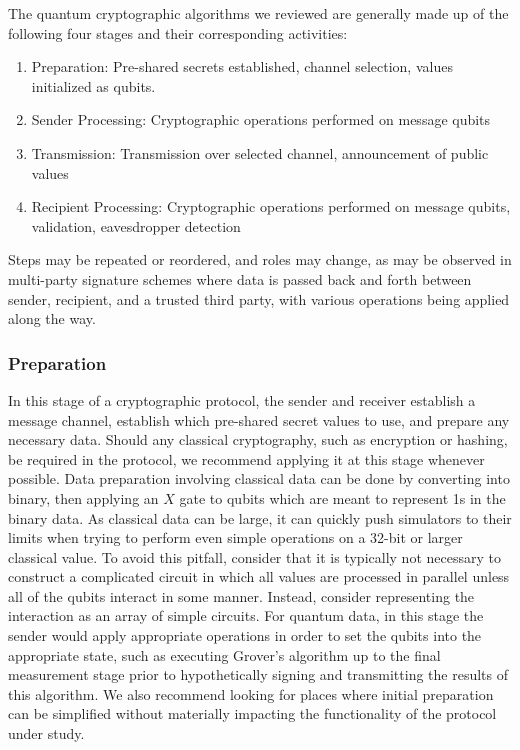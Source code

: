 \documentclass[sigconf]{acmart}
\begin{document}
The quantum cryptographic algorithms we reviewed are generally made up of the following four stages and their corresponding activities:
\begin{enumerate}
\item Preparation: Pre-shared secrets established, channel selection, values initialized as qubits.
\item Sender Processing: Cryptographic operations performed on message qubits
\item Transmission: Transmission over selected channel, announcement of public values
\item Recipient Processing: Cryptographic operations performed on message qubits, validation, eavesdropper detection
\end{enumerate}
Steps may be repeated or reordered, and roles may change, as may be observed in multi-party signature schemes where data is passed back and forth between sender, recipient, and a trusted third party, with various operations being applied along the way.

\subsubsection{Preparation}
In this stage of a cryptographic protocol, the sender and receiver establish a message channel, establish which pre-shared secret values to use, and prepare any necessary data. Should any classical cryptography, such as encryption or hashing, be required in the protocol, we recommend applying it at this stage whenever possible. Data preparation involving classical data can be done by converting into binary, then applying an $X$ gate to qubits which are meant to represent 1s in the binary data. As classical data can be large, it can quickly push simulators to their limits when trying to perform even simple operations on a 32-bit or larger classical value. To avoid this pitfall, consider that it is typically not necessary to construct a complicated circuit in which all values are processed in parallel unless all of the qubits interact in some manner. Instead, consider representing the interaction as an array of simple circuits. For quantum data, in this stage the sender would apply appropriate operations in order to set the qubits into the appropriate state, such as executing Grover's algorithm up to the final measurement stage prior to hypothetically signing and transmitting the results of this algorithm. We also recommend looking for places where initial preparation can be simplified without materially impacting the functionality of the protocol under study.
\end{document}
